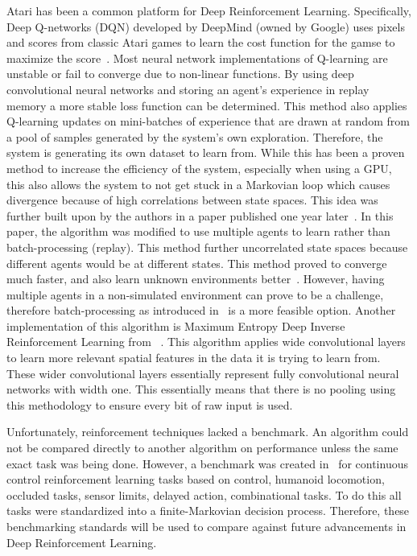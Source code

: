 \documentclass[12pt,american]{report}
\begin{document}
	Atari has been a common platform for Deep Reinforcement Learning. Specifically, Deep Q-networks (DQN) developed by DeepMind (owned by Google) uses pixels and scores from classic Atari games to learn the cost function for the gamse to maximize the score~\cite{mnih2015human}. Most neural network implementations of Q-learning are unstable or fail to converge due to non-linear functions. By using deep convolutional neural networks and storing an agent's experience in replay memory a more stable loss function can be determined.   This method also applies Q-learning updates on mini-batches of experience that are drawn at random from a pool of samples generated by the system's own exploration. Therefore, the system is generating its own dataset to learn from. While this has been a proven method to increase the efficiency of the system, especially when using a GPU, this also allows the system to not get stuck in a Markovian loop which causes divergence because of high correlations between state spaces.  This idea was further built upon by the authors in a paper published one year later~\cite{mnih2016asynchronous}. In this paper, the algorithm was modified to use multiple agents to learn rather than batch-processing (replay). This method further uncorrelated state spaces because different agents would be at different states. This method proved to converge much faster, and also learn unknown environments better~\cite{mnih2016asynchronous}. However, having multiple agents in a non-simulated environment can prove to be a challenge, therefore batch-processing as introduced in~\cite{mnih2015human} is a more feasible option. Another implementation of this algorithm is Maximum Entropy Deep Inverse Reinforcement Learning from ~\cite{wulfmeier2015maximum}. This algorithm applies wide convolutional layers to learn more relevant spatial features in the data it is trying to learn from. These wider convolutional layers essentially represent fully convolutional neural networks with width one. This essentially means that there is no pooling using this methodology to ensure every bit of raw input is used. 
	
	Unfortunately, reinforcement techniques lacked a benchmark.  An algorithm could not be compared directly to another algorithm on performance unless the same exact task was being done.  However, a benchmark was created in~\cite{duan2016benchmarking} for continuous control reinforcement learning tasks based on control, humanoid locomotion, occluded tasks, sensor limits, delayed action, combinational tasks. To do this all tasks were standardized into a finite-Markovian decision process. Therefore, these benchmarking standards will be used to compare against future advancements in Deep Reinforcement Learning. 
\end{document}
